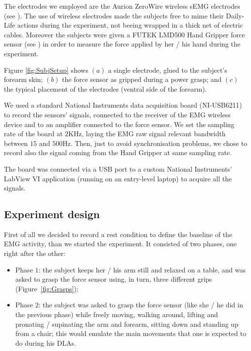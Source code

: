 The electrodes we employed are the Aurion ZeroWire wireless sEMG electrodes (see \cite{zerowire}). The use of wireless electrodes made the subjects free to mime their Daily-Life actions during the experiment, not beeing wrapped in a thick net of electric cables. Moreover the subjects were given a FUTEK LMD500 Hand Gripper force sensor (see \cite{LMD500}) in order to measure the force applied by her / his hand during the experiment.

Figure \ref{fig:SubjSetup} shows $(a)$ a single electrode, glued to the subject's forearm skin; $(b)$ the force sensor as gripped during a power grasp; and $(c)$ the typical placement of the electrodes (ventral side of the forearm).

We used a standard National Instruments data acquisition board (NI-USB6211) to record the sensors' signals, connected to the receiver of the EMG wireless device and to an amplifier connected to the force sensor. We set the sampling rate of the board at $2$KHz, laying the EMG raw signal relevant bandwidth between $15$ and $500$Hz. Then, just to avoid synchronisation problems, we chose to record also the signal coming from the Hand Gripper at same sampling rate.

The board was connected via a USB port to a custom National Instruments' LabView VI application (running on an entry-level laptop) to acquire all the signals.

\subsection{Experiment design}

First of all we decided to record a rest condition to define the baseline of the EMG activity, than we started the experiment. It consisted of two phases, one right after the other:

\begin{itemize}
	\item Phase $1$: the subject keeps her / his arm still and relaxed on a table, and was asked to grasp the force sensor using, in turn, three different grips (Figure~\ref{fig:Grasps});
	\item Phase $2$: the subject was asked to grasp the force sensor (like she / he did in the previous phase) while freely moving, walking around, lifting and pronating / supinating the arm and forearm, sitting down and standing up from a chair; this would emulate the main movements that one is expected to do during his DLAs.
\end{itemize}

